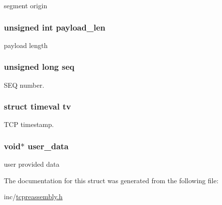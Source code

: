segment origin 

\hypertarget{struct__tcp__segment___a3d431f3cd732945366a2d6d553a69f5c}{
\subsubsection[{payload\-\_\-len}]{\setlength{\rightskip}{0pt plus 5cm}unsigned int payload\-\_\-len}}\label{struct__tcp__segment___a3d431f3cd732945366a2d6d553a69f5c}


payload length 

\hypertarget{struct__tcp__segment___a189930c4babdc38135a74db479534069}{
\subsubsection[{seq}]{\setlength{\rightskip}{0pt plus 5cm}unsigned long seq}}\label{struct__tcp__segment___a189930c4babdc38135a74db479534069}


S\-E\-Q number. 

\hypertarget{struct__tcp__segment___a9cf96982557d56650f0f4cd3762f05a0}{
\subsubsection[{tv}]{\setlength{\rightskip}{0pt plus 5cm}struct timeval tv}}\label{struct__tcp__segment___a9cf96982557d56650f0f4cd3762f05a0}


T\-C\-P timestamp. 

\hypertarget{struct__tcp__segment___a0f53d287ac7c064d1a49d4bd93ca1cb9}{
\subsubsection[{user\-\_\-data}]{\setlength{\rightskip}{0pt plus 5cm}void$\ast$ user\-\_\-data}}\label{struct__tcp__segment___a0f53d287ac7c064d1a49d4bd93ca1cb9}


user provided data 



The documentation for this struct was generated from the following file\-:\begin{DoxyCompactItemize}
\item 
inc/\hyperlink{tcpreassembly_8h}{tcpreassembly.\-h}\end{DoxyCompactItemize}
